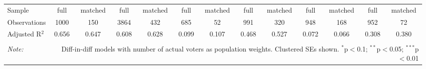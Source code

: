\begin{table}[!htbp]
\begin{tabular}{@{\extracolsep{5pt}}lcccccccccccc}
Sample & full & matched & full & matched & full & matched & full & matched & full & matched & full & matched \\ 
Observations & 1000 & 150 & 3864 & 432 & 685 & 52 & 991 & 320 & 948 & 168 & 952 & 72 \\ 
Adjusted R$^{2}$ & 0.656 & 0.647 & 0.608 & 0.628 & 0.099 & 0.107 & 0.468 & 0.527 & 0.072 & 0.066 & 0.308 & 0.380 \\ 
\hline 
\hline \\[-1.8ex] 
\textit{Note:}  & \multicolumn{12}{r}{Diff-in-diff models with number of actual voters as population weights. Clustered SEs shown. $^{*}$p$<$0.1; $^{**}$p$<$0.05; $^{***}$p$<$0.01} \\ 
\end{tabular} 
\end{table} 
